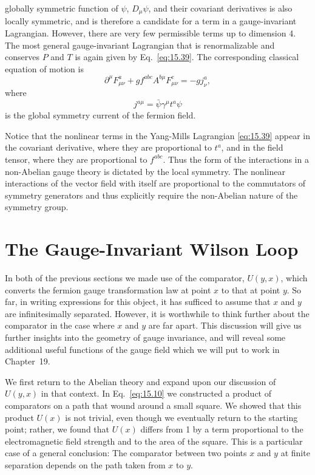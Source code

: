 globally symmetric function of $\psi$, $D_\mu\psi$, and their covariant
derivatives is also locally symmetric, and is therefore a candidate for a
term in a gauge-invariant Lagrangian.  However, there are very few
permissible terms up to dimension 4.  The most general gauge-invariant
Lagrangian that is renormalizable and conserves $P$ and $T$ is again given by
Eq.~\eqref{eq:15.39}.  The corresponding classical equation of motion is
\begin{equation}
  \partial^\mu F^a_{\mu\nu} + gf^{abc}A^{b\mu}F^c_{\mu\nu} = -gj^a_\nu ,
  \label{eq:15.51}
\end{equation}
where
\begin{equation}
  j^{a\mu} = \bar{\psi}\gamma^\mu t^a\psi
  \label{eq:15.52}
\end{equation}
is the global symmetry current of the fermion field.

Notice that the nonlinear terms in the Yang-Mills Lagrangian \eqref{eq:15.39}
appear in the covariant derivative, where they are proportional to $t^a$, and
in the field tensor, where they are proportional to $f^{abc}$.  Thus the form
of the interactions in a non-Abelian gauge theory is dictated by the local
symmetry.  The nonlinear interactions of the vector field with itself are
proportional to the commutators of symmetry generators and thus explicitly
require the non-Abelian nature of the symmetry group.

\section{The Gauge-Invariant Wilson Loop}

In both of the previous sections we made use of the comparator, $U(y,x)$,
which converts the fermion gauge transformation law at point $x$ to that at
point $y$.  So far, in writing expressions for this object, it has sufficed to
assume that $x$ and $y$ are infinitesimally separated.  However, it is
worthwhile to think further about the comparator in the case where $x$ and
$y$ are far apart.  This discussion will give us further insights into the
geometry of gauge invariance, and will reveal some additional useful functions
of the gauge field which we will put to work in Chapter~19.

We first return to the Abelian theory and expand upon our discussion of
$U(y,x)$ in that context.  In Eq.~\eqref{eq:15.10} we constructed a product
of comparators on a path that wound around a small square.  We showed that
this product $U(x)$ is not trivial, even though we eventually return to the
starting point; rather, we found that $U(x)$ differs from 1 by a term
proportional to the electromagnetic field strength and to the area of the
square.  This is a particular case of a general conclusion: The comparator
between two points $x$ and $y$ at finite separation depends on the path taken
from $x$ to $y$.


